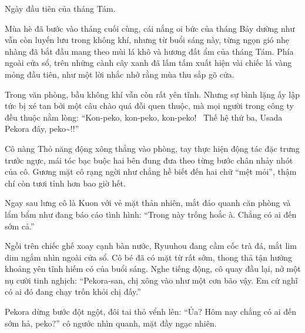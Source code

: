 \documentclass[../main.tex]{subfiles}
\begin{document}

Ngày đầu tiên của tháng Tám.

Mùa hè đã bước vào tháng cuối cùng, cái nắng oi bức của tháng Bảy dường như vẫn còn luyến lưu trong không khí, nhưng từ buổi sáng này, từng ngọn gió nhẹ nhàng đã bắt đầu mang theo mùi lá khô và hương đất ẩm của tháng Tám. Phía ngoài cửa sổ, trên những cành cây xanh đã lấm tấm xuất hiện vài chiếc lá vàng mỏng đầu tiên, như một lời nhắc nhở rằng mùa thu sắp gõ cửa.

Trong văn phòng, bầu không khí vẫn còn rất yên tĩnh. Nhưng sự bình lặng ấy lập tức bị xé tan bởi một câu chào quá đỗi quen thuộc, mà mọi người trong công ty đều thuộc nằm lòng: ``Kon-peko, kon-peko, kon-peko! \hll\ Thế hệ thứ ba, Usada Pekora đây, peko\~{}!!''

Cô nàng Thỏ năng động xông thẳng vào phòng, tay thực hiện động tác đặc trưng trước ngực, mái tóc bạc buộc hai bên đung đưa theo từng bước chân nhảy nhót của cô. Gương mặt cô rạng ngời như chẳng hề biết đến hai chữ ``mệt mỏi'', thậm chí còn tươi tỉnh hơn bao giờ hết.

Ngay sau lưng cô là Kuon với vẻ mặt thản nhiên, mắt đảo quanh căn phòng và lẩm bẩm như đang báo cáo tình hình: ``Trong này trống hoắc à. Chẳng có ai đến sớm cả.''

Ngồi trên chiếc ghế xoay cạnh bàn nước, Ryuuhou đang cầm cốc trà đá, mắt lim dim ngắm nhìn ngoài cửa sổ. Cô bé đã có mặt từ rất sớm, thong thả tận hưởng khoảng yên tĩnh hiếm có của buổi sáng. Nghe tiếng động, cô quay đầu lại, nở một nụ cười tinh nghịch: ``Pekora-san, chị xông vào như một cơn bão vậy. Em cứ nghĩ có ai đó đang chạy trốn khỏi chị đấy.''

Pekora dừng bước đột ngột, đôi tai thỏ vểnh lên: ``Ủa? Hôm nay chẳng có ai đến sớm hả, peko?'' cô ngước nhìn quanh, mặt đầy ngạc nhiên.
\end{document}
